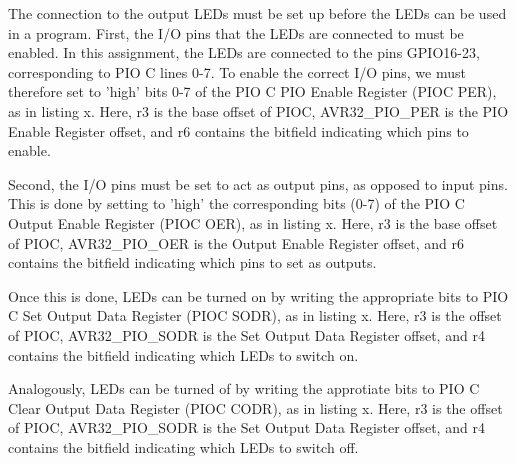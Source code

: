 The connection to the output LEDs must be set up before the LEDs can be used in a program.
First, the I/O pins that the LEDs are connected to must be enabled.
In this assignment, the LEDs are connected to the pins GPIO16-23, corresponding to PIO C lines 0-7.
To enable the correct I/O pins, we must therefore set to 'high' bits 0-7 of the PIO C PIO Enable Register (PIOC PER), as in listing x.
Here, r3 is the base offset of PIOC, AVR32\_PIO\_PER is the PIO Enable Register offset, and r6 contains the bitfield indicating which pins to enable.


Second, the I/O pins must be set to act as output pins, as opposed to input pins.
This is done by setting to 'high' the corresponding bits (0-7) of the PIO C Output Enable Register (PIOC OER), as in listing x.
Here, r3 is the base offset of PIOC, AVR32\_PIO\_OER is the Output Enable Register offset, and r6 contains the bitfield indicating which pins to set as outputs.


Once this is done, LEDs can be turned on by writing the appropriate bits to PIO C Set Output Data Register (PIOC SODR), as in listing x.
Here, r3 is the offset of PIOC, AVR32\_PIO\_SODR is the Set Output Data Register offset, and r4 contains the bitfield indicating which LEDs to switch on.


Analogously, LEDs can be turned of by writing the approtiate bits to PIO C Clear Output Data Register (PIOC CODR), as in listing x. 
Here, r3 is the offset of PIOC, AVR32\_PIO\_SODR is the Set Output Data Register offset, and r4 contains the bitfield indicating which LEDs to switch off.

